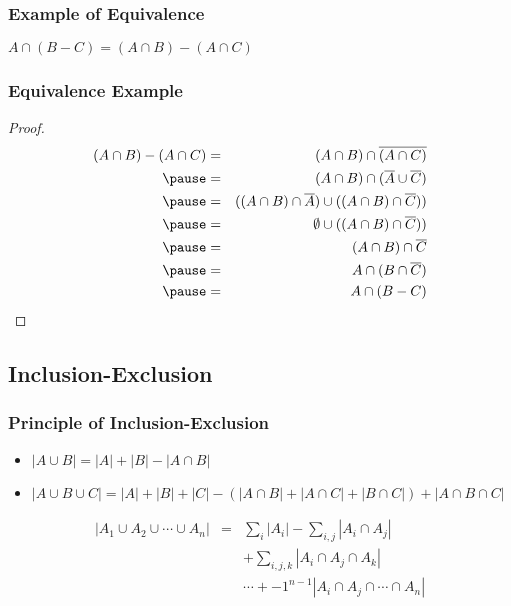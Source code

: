 \documentclass[dvipsnames]{beamer}
\begin{document}
\begin{frame}
  \frametitle{Example of Equivalence}

  \begin{theorem}
    $A \cap (B-C) = (A \cap B) - (A \cap C)$
  \end{theorem}
\end{frame}

\begin{frame}
  \frametitle{Equivalence Example}

  \begin{proof}
    \begin{eqnarray*}
      (A \cap B) - (A \cap C)
          & = & (A \cap B) \cap \overline{(A \cap C)}\\\pause
          & = & (A \cap B) \cap (\overline{A} \cup \overline{C})\\\pause
          & = & ((A \cap B) \cap \overline{A}) \cup ((A \cap B) \cap \overline{C}))\\\pause
          & = & \emptyset \cup ((A \cap B) \cap \overline{C}))\\\pause
          & = & (A \cap B) \cap \overline{C}\\\pause
          & = & A \cap (B \cap \overline{C})\\\pause
          & = & A \cap (B - C)
    \end{eqnarray*}
  \end{proof}
\end{frame}

\subsection{Inclusion-Exclusion}

\begin{frame}
  \frametitle{Principle of Inclusion-Exclusion}

  \begin{itemize}
    \item $|A \cup B| = |A| + |B| - |A \cap B|$

    \pause
    \item $|A \cup B \cup C| = |A| + |B| + |C|
      - (|A \cap B| + |A \cap C| + |B \cap C|)
      + |A \cap B \cap C|$
  \end{itemize}

  \pause
  \begin{theorem}
    \begin{eqnarray*}
      |A_1 \cup A_2 \cup \cdots \cup A_n| & = & \sum_i{|A_i|}
          - \sum_{i,j}{|A_i \cap A_j|}\\
      & & + \sum_{i,j,k}{|A_i \cap A_j \cap A_k|}\\
      & & \cdots + -1^{n-1} {|A_i \cap A_j \cap \cdots \cap A_n|}
    \end{eqnarray*}
  \end{theorem}
\end{frame}
\end{document}
